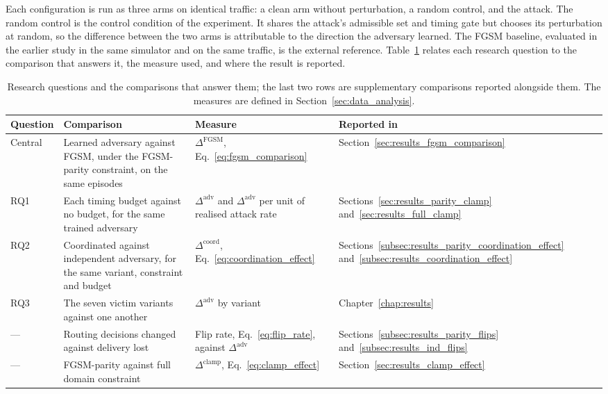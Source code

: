 Each configuration is run as three arms on identical traffic: a clean arm without
perturbation, a random control, and the attack. The random control is the control
condition of the experiment. It shares the attack's admissible set and timing gate but
chooses its perturbation at random, so the difference between the two arms is
attributable to the direction the adversary learned. The FGSM baseline, evaluated in the
earlier study in the same simulator and on the same traffic, is the external reference.
Table~\ref{tab:rq_design} relates each research question to the comparison that answers
it, the measure used, and where the result is reported.

\begin{table}[htbp]
  \centering
  \small
  \caption{Research questions and the comparisons that answer them; the last two rows
           are supplementary comparisons reported alongside them. The measures are
           defined in Section~\ref{sec:data_analysis}.}
  \label{tab:rq_design}
  \begin{tabular}{>{\raggedright\arraybackslash}p{1.6cm}
                  >{\raggedright\arraybackslash}p{4.8cm}
                  >{\raggedright\arraybackslash}p{3.7cm}
                  >{\raggedright\arraybackslash}p{2.6cm}}
    \hline
    \textbf{Question} & \textbf{Comparison} & \textbf{Measure} & \textbf{Reported in} \\
    \hline
    Central & Learned adversary against FGSM, under the FGSM-parity constraint, on the
              same episodes
            & $\Delta^{\text{FGSM}}$, Eq.~\eqref{eq:fgsm_comparison}
            & Section~\ref{sec:results_fgsm_comparison} \\
    RQ1     & Each timing budget against no budget, for the same trained adversary
            & $\Delta^{\text{adv}}$ and $\Delta^{\text{adv}}$ per unit of realised
              attack rate
            & Sections~\ref{sec:results_parity_clamp} and~\ref{sec:results_full_clamp} \\
    RQ2     & Coordinated against independent adversary, for the same variant,
              constraint and budget
            & $\Delta^{\text{coord}}$, Eq.~\eqref{eq:coordination_effect}
            & Sections~\ref{subsec:results_parity_coordination_effect}
              and~\ref{subsec:results_coordination_effect} \\
    RQ3     & The seven victim variants against one another
            & $\Delta^{\text{adv}}$ by variant
            & Chapter~\ref{chap:results} \\
    ---     & Routing decisions changed against delivery lost
            & Flip rate, Eq.~\eqref{eq:flip_rate}, against $\Delta^{\text{adv}}$
            & Sections~\ref{subsec:results_parity_flips}
              and~\ref{subsec:results_ind_flips} \\
    ---     & FGSM-parity against full domain constraint
            & $\Delta^{\text{clamp}}$, Eq.~\eqref{eq:clamp_effect}
            & Section~\ref{sec:results_clamp_effect} \\
    \hline
  \end{tabular}
\end{table}

